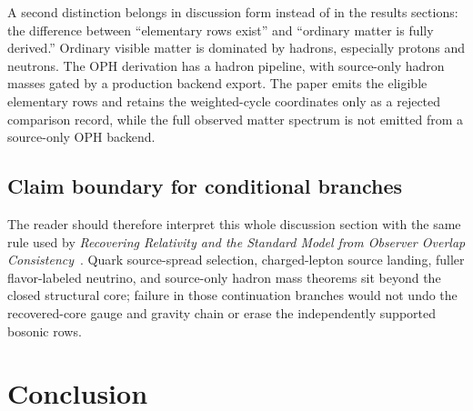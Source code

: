 \documentclass[11pt]{article}
\begin{document}
A second distinction belongs in discussion form instead of in the results sections: the
difference between ``elementary rows exist'' and ``ordinary matter is fully derived.'' Ordinary
visible matter is dominated by hadrons, especially protons and neutrons. The OPH
derivation has a hadron pipeline, with source-only hadron masses gated by a production
backend export. The paper emits the eligible elementary rows and retains the weighted-cycle
coordinates only as a rejected comparison record, while the full
observed matter spectrum is not emitted from a source-only OPH backend.

\subsection{Claim boundary for conditional branches}

The reader should therefore interpret this whole discussion section with the same rule used by
\emph{Recovering Relativity and the Standard Model from Observer Overlap Consistency}~\cite{ophcompact}. Quark source-spread selection, charged-lepton source landing, fuller flavor-labeled neutrino, and source-only hadron mass theorems sit beyond the closed structural core; failure in those continuation branches would not undo the recovered-core gauge and gravity chain or erase the independently supported bosonic rows.

\section{Conclusion}
\end{document}
